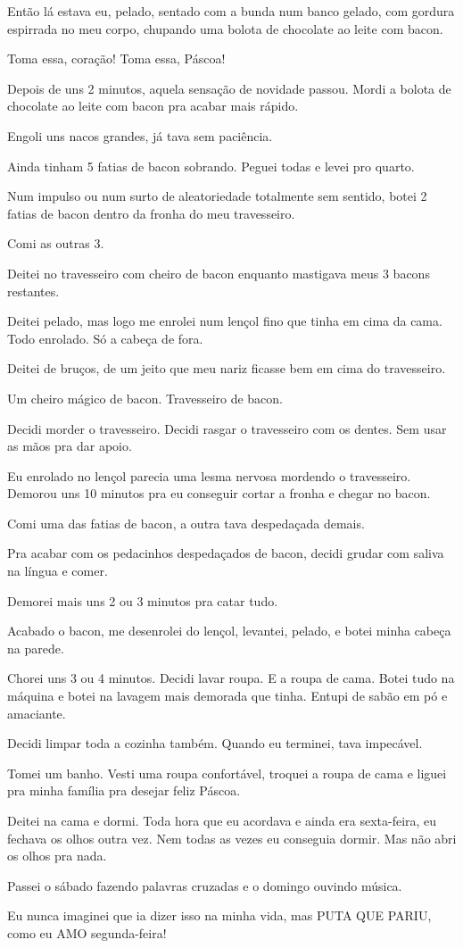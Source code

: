 \begin{sloppypar}
Então lá estava eu, pelado, sentado com a bunda num banco gelado, com gordura espirrada no meu corpo, chupando uma bolota de chocolate ao leite com bacon.
\end{sloppypar}

Toma essa, coração! Toma essa, Páscoa!

Depois de uns 2 minutos, aquela sensação de novidade passou. Mordi a bolota de chocolate ao leite com bacon pra acabar mais rápido.

Engoli uns nacos grandes, já tava sem paciência.

Ainda tinham 5 fatias de bacon sobrando. Peguei todas e levei pro quarto.

Num impulso ou num surto de aleatoriedade totalmente sem sentido, botei 2 fatias de bacon dentro da fronha do meu travesseiro.

Comi as outras 3.

Deitei no travesseiro com cheiro de bacon enquanto mastigava meus 3 bacons restantes.

Deitei pelado, mas logo me enrolei num lençol fino que tinha em cima da cama. Todo enrolado. Só a cabeça de fora.

Deitei de bruços, de um jeito que meu nariz ficasse bem em cima do travesseiro.

Um cheiro mágico de bacon. Travesseiro de bacon.

Decidi morder o travesseiro. Decidi rasgar o travesseiro com os dentes. Sem usar as mãos pra dar apoio.

Eu enrolado no lençol parecia uma lesma nervosa mordendo o travesseiro. Demorou uns 10 minutos pra eu conseguir cortar a fronha e chegar no bacon.

Comi uma das fatias de bacon, a outra tava despedaçada demais.

Pra acabar com os pedacinhos despedaçados de bacon, decidi grudar com saliva na língua e comer.

Demorei mais uns 2 ou 3 minutos pra catar tudo.

Acabado o bacon, me desenrolei do lençol, levantei, pelado, e botei minha cabeça na parede.

Chorei uns 3 ou 4 minutos. Decidi lavar roupa. E a roupa de cama. Botei tudo na máquina e botei na lavagem mais demorada que tinha. Entupi de sabão em pó e amaciante.

Decidi limpar toda a cozinha também. Quando eu terminei, tava impecável.

Tomei um banho. Vesti uma roupa confortável, troquei a roupa de cama e liguei pra minha família pra desejar feliz Páscoa.

Deitei na cama e dormi. Toda hora que eu acordava e ainda era sexta-feira, eu fechava os olhos outra vez. Nem todas as vezes eu conseguia dormir. Mas não abri os olhos pra nada.

Passei o sábado fazendo palavras cruzadas e o domingo ouvindo música.

Eu nunca imaginei que ia dizer isso na minha vida, mas PUTA QUE PARIU, como eu AMO segunda-feira!
